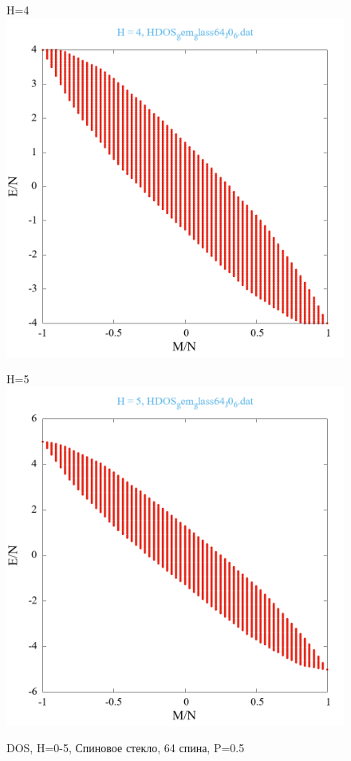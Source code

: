 \documentclass[utf8, babel, sor, jor, amsmath, amssymb, reprint]{elsarticle} %
\begin{document}
\begin{figure}[H]
\begin{minipage}[h]{0.45\linewidth}
	\end{minipage}
	\vfill
	\begin{minipage}[h]{0.45\linewidth}
		\centering H=4
		\includegraphics[width=1\linewidth]{HDOS_gem_glass64_J0_6.dat_H4.png}
	\end{minipage}
	\hfill
	\begin{minipage}[h]{0.45\linewidth}
		\centering H=5
		\includegraphics[width=1\linewidth]{HDOS_gem_glass64_J0_6.dat_H5.png}
	\end{minipage}
	\caption{DOS, H=0-5, Спиновое стекло, 64 спина, P=0.5}
	\label{fig:HDOS_gem_glass64_J0_6.dat}
\end{figure}
\end{document}

